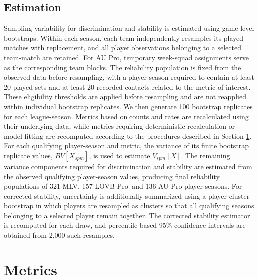 \documentclass[10pt]{article}
\begin{document}
\subsection{Estimation}

Sampling variability for discrimination and stability is estimated using game-level bootstraps.
Within each season, each team independently resamples its played matches with replacement, and all player observations belonging to a selected team-match are retained. 
For AU Pro, temporary week-squad assignments serve as the corresponding team blocks.
The reliability population is fixed from the observed data before resampling, with a player-season required to contain at least 20 played sets and at least 20 recorded contacts related to the metric of interest.
These eligibility thresholds are applied before resampling and are not reapplied within individual bootstrap replicates.
We then generate 100 bootstrap replicates for each league-season.
Metrics based on counts and rates are recalculated using their underlying data, while metrics requiring deterministic recalculation or model fitting are recomputed according to the procedures described in Section \ref{sec:metrics}.
For each qualifying player-season and metric, the variance of its finite bootstrap replicate values, $BV[X_{spm}]$, is used to estimate $V_{spm}[X]$.
The remaining variance components required for discrimination and stability are estimated from the observed qualifying player-season values, producing final reliability populations of 321 MLV, 157 LOVB Pro, and 136 AU Pro player-seasons.
For corrected stability, uncertainty is additionally summarized using a player-cluster bootstrap in which players are resampled as clusters so that all qualifying seasons belonging to a selected player remain together.
The corrected stability estimator is recomputed for each draw, and percentile-based 95\% confidence intervals are obtained from 2,000 such resamples.


\section{Metrics}
\label{sec:metrics}
\end{document}

